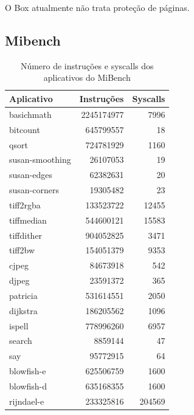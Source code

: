 \documentclass[11pt,twoside]{article}
\begin{document}
O Box atualmente não trata proteção de páginas.

\subsection{Mibench}

\begin{table}                                                                                                                                                                                              
 \caption{Número de instruções e syscalls dos aplicativos do MiBench}
 \begin{center}
  \begin{tabular}{|l|r|r|} \hline
    \bf{Aplicativo} & \bf{Instruções} & \bf{Syscalls} \\ \hline                                                                                                                                            
    basichmath & 2245174977 & 7996 \\ \hline
    bitcount & 645799557 & 18 \\ \hline
    qsort & 724781929 & 1160 \\ \hline
    susan-smoothing & 26107053 & 19 \\ \hline
    susan-edges & 62382631 & 20 \\ \hline
    susan-corners & 19305482 & 23 \\ \hline
    tiff2rgba & 133523722 & 12455 \\ \hline
    tiffmedian & 544600121 & 15583 \\ \hline
    tiffdither & 904052825 & 3471 \\ \hline
    tiff2bw & 154051379 & 9353 \\ \hline
    cjpeg & 84673918 & 542 \\ \hline
    djpeg & 23591372 & 365 \\ \hline
    patricia & 531614551 & 2050 \\ \hline
    dijkstra & 186205562 & 1096 \\ \hline
    ispell & 778996260 & 6957 \\ \hline
    search & 8859144 & 47 \\ \hline
    say & 95772915 & 64 \\ \hline
    blowfish-e & 625506759 & 1600 \\ \hline
    blowfish-d & 635168355 & 1600 \\ \hline
    rijndael-e & 233325816 & 204569 \\ \hline

\end{tabular}
\end{center}
\end{table}
\end{document}
